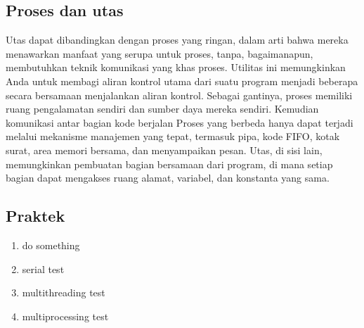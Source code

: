 \subsection{Proses dan utas}
Utas dapat dibandingkan dengan proses yang ringan, dalam arti bahwa mereka menawarkan manfaat yang serupa untuk proses, tanpa, bagaimanapun, membutuhkan teknik komunikasi yang khas proses. Utilitas ini memungkinkan Anda untuk membagi aliran kontrol utama dari suatu program menjadi beberapa secara bersamaan menjalankan aliran kontrol. Sebagai gantinya, proses memiliki ruang pengalamatan sendiri dan sumber daya mereka sendiri. Kemudian komunikasi antar bagian kode berjalan Proses yang berbeda hanya dapat terjadi melalui mekanisme manajemen yang tepat, termasuk pipa, kode FIFO, kotak surat, area memori bersama, dan menyampaikan pesan. Utas, di sisi lain, memungkinkan pembuatan bagian bersamaan dari program, di mana setiap bagian dapat mengakses ruang alamat, variabel, dan konstanta yang sama.
\subsection{Praktek}
\begin{enumerate}
	\item do something
    
	\hfill\break
	\item serial test
	\hfill\break
	
	\item multithreading test
	\hfill\break
	
	\item multiprocessing test
	\hfill\break
	
\end{enumerate}
